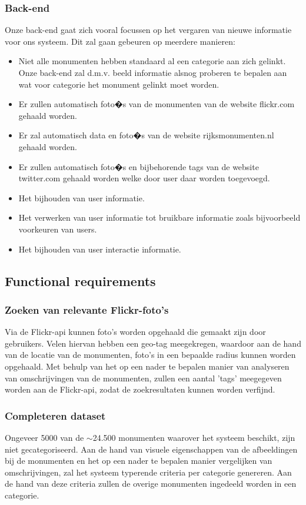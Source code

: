 \documentclass[a4paper,10pt]{article}
\begin{document}
		\subsubsection{Back-end}
			Onze back-end gaat zich vooral focussen op het vergaren van nieuwe informatie voor ons systeem. Dit zal gaan gebeuren op meerdere manieren:
			\begin{itemize}
				\item Niet alle monumenten hebben standaard al een categorie aan zich gelinkt. Onze back-end zal d.m.v. beeld informatie alsnog proberen te bepalen aan wat voor categorie het monument gelinkt moet worden.
				\item Er zullen automatisch foto�s van de monumenten van de website flickr.com gehaald worden.
				\item Er zal automatisch data en foto�s van de website rijksmonumenten.nl gehaald worden.
				\item Er zullen automatisch foto�s en bijbehorende tags van de website twitter.com gehaald worden welke door user daar worden toegevoegd.
				\item Het bijhouden van user informatie.
				\item Het verwerken van user informatie tot bruikbare informatie zoals bijvoorbeeld voorkeuren van users.
				\item Het bijhouden van user interactie informatie.
			\end{itemize}
	
		\subsection{Functional requirements}
			\subsubsection{Zoeken van relevante Flickr-foto's}
			Via de Flickr-api kunnen foto's worden opgehaald die gemaakt zijn door gebruikers. Velen hiervan hebben een geo-tag meegekregen, waardoor aan de hand van de locatie van de monumenten, foto's in een bepaalde radius kunnen worden opgehaald. Met behulp van het op een nader te bepalen manier van analyseren van omschrijvingen van de monumenten, zullen een aantal 'tags' meegegeven worden aan de Flickr-api, zodat de zoekresultaten kunnen worden verfijnd.
			
			\subsubsection{Completeren dataset}
			Ongeveer 5000 van de $\sim$24.500 monumenten waarover het systeem beschikt, zijn niet gecategoriseerd. Aan de hand van visuele eigenschappen van de afbeeldingen bij de monumenten en het op een nader te bepalen manier vergelijken van omschrijvingen, zal het systeem typerende criteria per categorie genereren. Aan de hand van deze criteria zullen de overige monumenten ingedeeld worden in een categorie.
				
\end{document}
